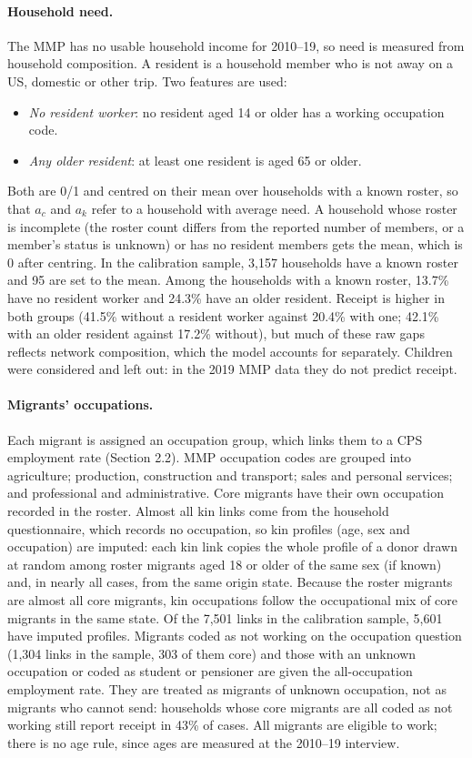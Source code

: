 \documentclass[11pt]{article}
\begin{document}
\paragraph{Household need.} The MMP has no usable household income for 2010--19, so need is measured from household composition. A resident is a household member who is not away on a US, domestic or other trip. Two features are used:
\begin{itemize}[leftmargin=*]
\item \emph{No resident worker}: no resident aged 14 or older has a working occupation code.
\item \emph{Any older resident}: at least one resident is aged 65 or older.
\end{itemize}
Both are 0/1 and centred on their mean over households with a known roster, so that $a_c$ and $a_k$ refer to a household with average need. A household whose roster is incomplete (the roster count differs from the reported number of members, or a member's status is unknown) or has no resident members gets the mean, which is 0 after centring. In the calibration sample, 3,157 households have a known roster and 95 are set to the mean. Among the households with a known roster, 13.7\% have no resident worker and 24.3\% have an older resident. Receipt is higher in both groups (41.5\% without a resident worker against 20.4\% with one; 42.1\% with an older resident against 17.2\% without), but much of these raw gaps reflects network composition, which the model accounts for separately. Children were considered and left out: in the 2019 MMP data they do not predict receipt.

\paragraph{Migrants' occupations.} Each migrant is assigned an occupation group, which links them to a CPS employment rate (Section 2.2). MMP occupation codes are grouped into agriculture; production, construction and transport; sales and personal services; and professional and administrative. Core migrants have their own occupation recorded in the roster. Almost all kin links come from the household questionnaire, which records no occupation, so kin profiles (age, sex and occupation) are imputed: each kin link copies the whole profile of a donor drawn at random among roster migrants aged 18 or older of the same sex (if known) and, in nearly all cases, from the same origin state. Because the roster migrants are almost all core migrants, kin occupations follow the occupational mix of core migrants in the same state. Of the 7,501 links in the calibration sample, 5,601 have imputed profiles. Migrants coded as not working on the occupation question (1,304 links in the sample, 303 of them core) and those with an unknown occupation or coded as student or pensioner are given the all-occupation employment rate. They are treated as migrants of unknown occupation, not as migrants who cannot send: households whose core migrants are all coded as not working still report receipt in 43\% of cases. All migrants are eligible to work; there is no age rule, since ages are measured at the 2010--19 interview.
\end{document}
